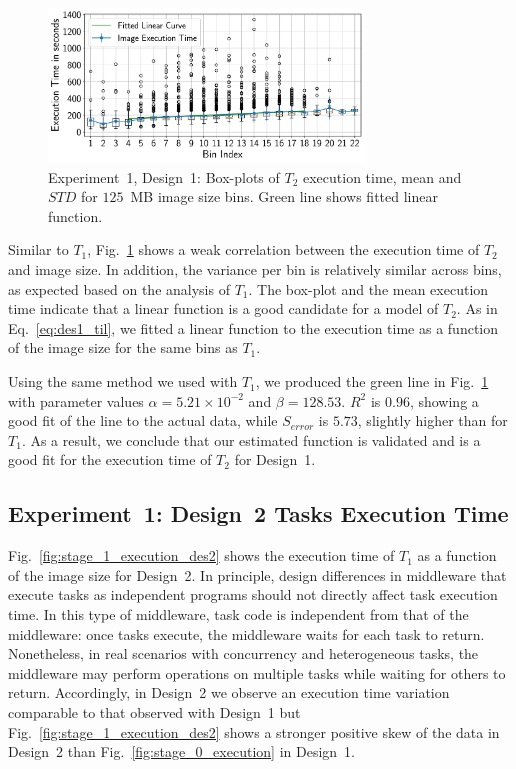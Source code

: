 \begin{figure}[H]
    \centering
    \includegraphics[width=0.75\textwidth]{figures/designs/stage_1_tx_box.pdf}
    \caption{Experiment~1, Design~1: Box-plots of $T_{2}$ execution time, mean and $STD$ for $125$~MB image size bins.
        Green line shows fitted linear function.}
    \label{fig:stage_1_execution}
\end{figure}

Similar to $T_{1}$, Fig.~\ref{fig:stage_1_execution} shows a weak correlation between the execution time of $T_{2}$ and image size.
In addition, the variance per bin is relatively similar across bins, as expected based on the analysis of $T_{1}$.
The box-plot and the mean execution time indicate that a linear function is a good candidate for a model of $T_{2}$.
As in Eq.~\ref{eq:des1_til}, we fitted a linear function to the execution time as a function of the image size for the same bins as $T_{1}$.

Using the same method we used with $T_{1}$, we produced the green line in Fig.~\ref{fig:stage_1_execution} with parameter values $\alpha = 5.21 \times 10^{-2}$ and $\beta = 128.53$.
$R^{2}$ is $0.96$, showing a good fit of the line to the actual data, while $S_{error}$ is $5.73$, slightly higher than for $T_{1}$.
As a result, we conclude that our estimated function is validated and is a good fit for the execution time of $T_{2}$ for Design~1.

\subsection{Experiment~1: Design~2 Tasks Execution Time}

Fig.~\ref{fig:stage_1_execution_des2} shows the execution time of $T_{1}$ as a function of the image size for Design~2.
In principle, design differences in middleware that execute tasks as independent programs should not directly affect task execution time.
In this type of middleware, task code is independent from that of the middleware: once tasks execute, the middleware waits for each task to return.
Nonetheless, in real scenarios with concurrency and heterogeneous tasks, the middleware may perform operations on multiple tasks while waiting for others to return.
Accordingly, in Design~2 we observe an execution time variation comparable to that observed with Design~1 but Fig.~\ref{fig:stage_1_execution_des2} shows a stronger positive skew of the data in Design~2 than Fig.~\ref{fig:stage_0_execution} in Design~1.

